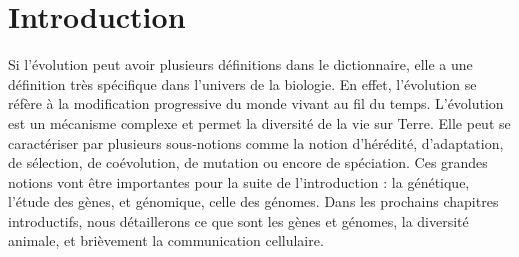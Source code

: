 \chapter[Introduction]{Introduction}
\thispagestyle{firstpage}
\onehalfspacing
\setcounter{page}{1}
\par Si l’évolution peut avoir plusieurs définitions dans le dictionnaire, elle a une définition très spécifique dans l’univers de la biologie. En effet, l'évolution se réfère à la modification progressive du monde vivant au fil du temps. L’évolution est un mécanisme complexe et permet la diversité de la vie sur Terre. Elle peut se caractériser par plusieurs sous-notions comme la notion d’hérédité, d’adaptation, de sélection, de coévolution, de mutation ou encore de spéciation. Ces grandes notions vont être importantes pour la suite de l’introduction : la génétique, l’étude des gènes, et génomique, celle des génomes. Dans les prochains chapitres introductifs, nous détaillerons ce que sont les gènes et génomes, la diversité animale, et brièvement la communication cellulaire. 

